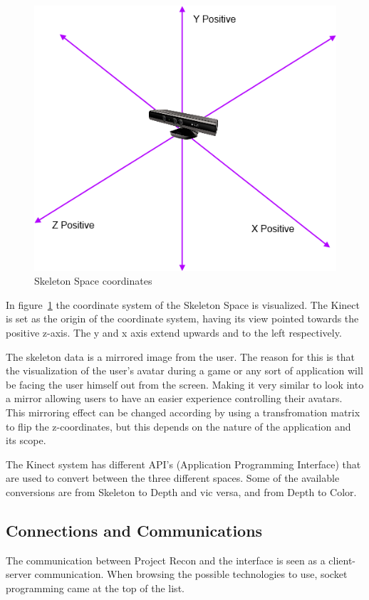 \begin{figure}[!htbp]
\centering
\includegraphics{images/skeletoncoord.png}
\caption{Skeleton Space coordinates}
\label{skeletoncoord}
\end{figure}

In figure~\ref{skeletoncoord} the coordinate system of the Skeleton Space is visualized. The Kinect is set as the origin of the coordinate system, having its view pointed towards the positive z-axis. The y and x axis extend upwards and to the left respectively.

The skeleton data is a mirrored image from the user. The reason for this is that the visualization of the user's avatar during a game or any sort of application will be facing the user himself out from the screen. Making it very similar to look into a mirror allowing users to have an easier experience controlling their avatars. This mirroring effect can be changed according by using a transfromation matrix to flip the z-coordinates, but this depends on the nature of the application and its scope.

The Kinect system has different API's (Application Programming Interface) that are used to convert between the three different spaces. Some of the available conversions are from Skeleton to Depth and vic versa, and from Depth to Color.
\subsection{Connections and Communications}
The communication between Project Recon and the interface is seen as a client-server communication. When browsing the possible technologies to use, socket programming came at the top of the list.

